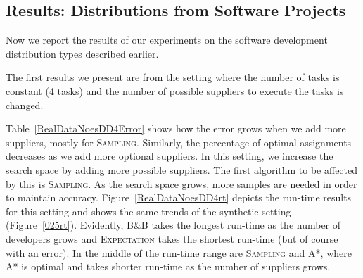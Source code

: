 \documentclass[letterpaper]{article} %
\newcommand{\astar}{\textsc{A*}\xspace}
\newcommand{\sampling}{\textsc{Sampling}\xspace}
\newcommand{\expectation}{\textsc{Expectation}\xspace}
\newcommand{\bnb}{\textsc{B\&B}\xspace}
\newcommand{\commentout}[1]{}
\begin{document}
\commentout{
\begin{figure}[h!]
	\scriptsize	
	\begin{tikzpicture}
	\begin{axis}[
	scale=0.7,
	ymode = log,
	xlabel={\#Tasks},
	ylabel near ticks,
	ylabel={Runtime (sec)},
	xmin=4, xmax=8,
	ymin=0, ymax=452,
	legend pos=outer north east,
	ymajorgrids=true,
	grid style=dashed,
	]
	
	\addplot[
	color=blue,
	mark=x,
	]
	coordinates { 
		(4 , 0.08) 
		(5 , 0.7) 
		(6 , 6.16)
		(7 , 47.67) 
		(8 , 452) 
		
	};
	\addlegendentry{BF}
	
	\addplot[
	color=gray,
	mark=x,
	]
	coordinates { 
		(4 , 0.11) 
		(5 , 0.25) 
		(6 , 0.8)
		(7 , 3.1) 
		(8 , 16.1)

	};
	\addlegendentry{\astar}
	
	
		\addplot[
	color=green,
	mark=o,
	]
	coordinates { 
		(4 , 0.13) 
		(5 , 0.53) 
		(6 , 2.37)
		(7 , 9) 
		(8 , 43) 
		
	};
	\addlegendentry{\sampling}
	
	\addplot[
	color=red,
	mark=square,
	]
	coordinates {
		(4 , 0.001) 
		(5 , 0.005) 
		(6 , 0.02)
		(7 , 0.09) 
		(8 , 0.4)

	};
	\addlegendentry{\expectation}
	
	\end{axis}
	\end{tikzpicture}
	\caption{Run time comparison of all heuristic algorithms for deadline of size $0.25\cdot maxd$ and ``Failure" distribution}\label{025failrt}
\end{figure}
}

\subsection{Results: Distributions from Software Projects}

Now we report the results of our experiments on the software development distribution types described earlier. 

The first results we present are from the setting where the number of tasks is constant (4 tasks) and the number of possible suppliers to execute the tasks is changed. 

Table~\ref{RealDataNoesDD4Error} shows how the error grows when we add more suppliers, mostly for \sampling. Similarly, the percentage of optimal assignments decreases as we add more optional suppliers. In this setting,  we increase the search space by adding more possible suppliers. The first algorithm to be affected by this is \sampling. As the search space grows, more samples are needed in order to maintain accuracy.
Figure~\ref{RealDataNoesDD4rt} depicts the run-time results for this setting and shows the same trends of the synthetic setting (Figure~\ref{025rt}). Evidently, \bnb takes the longest run-time as the number of developers grows and \expectation takes the shortest run-time (but of course with an error). In the middle of the run-time range are \sampling and \astar, where \astar is optimal and takes shorter run-time as the number of suppliers grows.  
\end{document}
